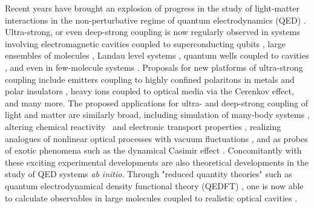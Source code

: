 \documentclass[aps,prl,twocolumn,
	groupedaddress,superscriptaddress,
	amsfonts,amssymb,amsmath,floatfix,
	citeautoscript]{revtex4-1}
\begin{document}
Recent years have brought an explosion of progress in the study of light-matter interactions in the non-perturbative regime of quantum electrodynamics (QED) \cite{flick7strong,ruggenthaler2017b,forn2018ultrastrong,kockum2018ultrastrong}. Ultra-strong, or even deep-strong coupling is now regularly observed in systems involving electromagnetic cavities coupled to superconducting qubits \cite{blais2004,wallraff2004,yoshihara2017superconducting,forn2017ultrastrong}, large ensembles of molecules \cite{hutchison2012,hutchison2013,coles2014,coles2014b,shalabney2015coherent, thomas2016,ebbesen2016}, Landau level systems \cite{hagenmuller2010ultrastrong,scalari2012ultrastrong,zhang2016collective},  quantum wells coupled to cavities \cite{todorov2010ultrastrong,geiser2012ultrastrong}, and even in few-molecule systems \cite{benz2016,chikkaraddy2016}. Proposals for new platforms of ultra-strong coupling include emitters coupling to highly confined polaritons in metals and polar insulators \cite{rivera2016shrinking}, heavy ions coupled to optical media via the Cerenkov effect, and many more. The proposed applications for ultra- and deep-strong coupling of light and matter are similarly broad, including simulation of many-body systems \cite{forn2018ultrastrong}, altering chemical reactivity~\cite{hutchison2012, thomas2016,flick2017} and electronic transport properties \cite{orgiu2015}, realizing analogues of nonlinear optical processes with vacuum fluctuations \cite{kockum2017deterministic}, and as probes of exotic phenomena such as the dynamical Casimir effect \cite{ciuti2005quantum}. Concomitantly with these exciting experimental developments are also theoretical developments in the study of QED systems \textit{ab initio}. Through "reduced quantity theories" such as quantum electrodynamical density functional theory (QEDFT) \cite{ruggenthaler2014,pellegrini2015,flick2015,dimitrov2017,flick2018,flick2018b,schaefer2018}, one is now able to calculate observables in large molecules coupled to realistic optical cavities  \cite{flick2017c}.
\end{document}
